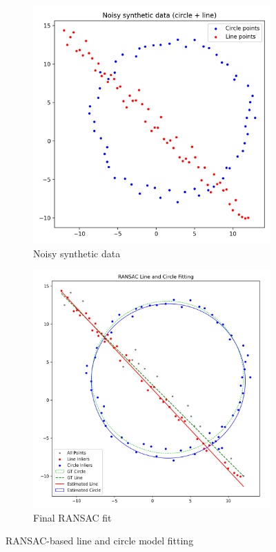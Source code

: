 \documentclass[12pt,a4paper]{article}
\begin{document}
\begin{figure}[H]
\begin{subfigure}{0.23\textwidth}
\includegraphics[width=\linewidth]{figures/q2_noisy_data.png}
\caption{Noisy synthetic data}
\end{subfigure}
\begin{subfigure}{0.23\textwidth}
\includegraphics[width=\linewidth]{figures/q2_ransac_final.png}
\caption{Final RANSAC fit}
\end{subfigure}
\caption{RANSAC-based line and circle model fitting}
\end{figure}
\end{document}
